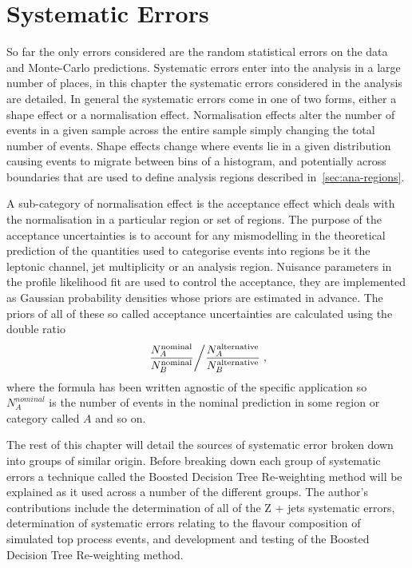 \chapter{Systematic Errors}%
\label{ch:systematics}

So far the only errors considered are the random statistical errors on the data
and Monte-Carlo predictions. Systematic errors enter into the analysis in a
large number of places, in this chapter the systematic errors considered in the
analysis are detailed. In general the systematic errors come in one of two
forms, either a shape effect or a normalisation effect. Normalisation effects
alter the number of events in a given sample across the entire sample simply
changing the total number of events. Shape effects change where events lie in a
given distribution causing events to migrate between bins of a histogram, and
potentially across boundaries that are used to define analysis regions described
in~\ref{sec:ana-regions}.

A sub-category of normalisation effect is the acceptance effect which deals with
the normalisation in a particular region or set of regions. The purpose of the
acceptance uncertainties is to account for any mismodelling in the theoretical
prediction of the quantities used to categorise events into regions be it the
leptonic channel, jet multiplicity or an analysis region. Nuisance parameters in
the profile likelihood fit are used to control the acceptance, they are
implemented as Gaussian probability densities whose priors are estimated in
advance. The priors of all of these so called acceptance uncertainties are
calculated using the double ratio
\begin{equation}
  \left. \dfrac{N_{A}^{\text{nominal}}}{N_{B}^{\text{nominal}}} \middle/ \dfrac{N_{A}^{\text{alternative}}}{N_{B}^{\text{alternative}}} \right.,
  \label{eq:acceptance-dr}
\end{equation}
where the formula has been written agnostic of the specific application so
$N_{A}^{nominal}$ is the number of events in the nominal prediction in some
region or category called $A$ and so on. 

The rest of this chapter will detail the sources of systematic error broken down
into groups of similar origin. Before breaking down each group of systematic
errors a technique called the Boosted Decision Tree Re-weighting method will be
explained as it used across a number of the different groups. The author's
contributions include the determination of all of the Z + jets systematic
errors, determination of systematic errors relating to the flavour composition
of simulated top process events, and development and testing of the Boosted
Decision Tree Re-weighting method.

